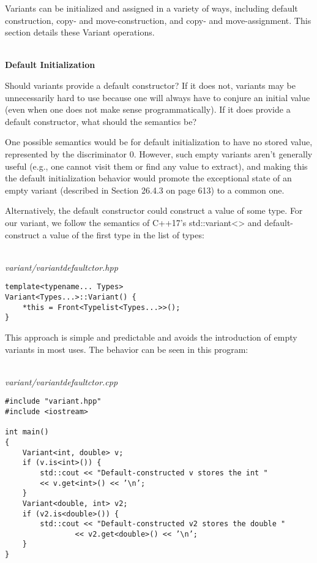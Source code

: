 Variants can be initialized and assigned in a variety of ways, including default construction, copy- and move-construction, and copy- and move-assignment. This section details these Variant operations.

\hspace*{\fill} \\ %
\noindent
\textbf{Default Initialization}

Should variants provide a default constructor? If it does not, variants may be unnecessarily hard to use because one will always have to conjure an initial value (even when one does not make sense programmatically). If it does provide a default constructor, what should the semantics be?

One possible semantics would be for default initialization to have no stored value, represented by the discriminator 0. However, such empty variants aren’t generally useful (e.g., one cannot visit them or find any value to extract), and making this the default initialization behavior would promote the exceptional state of an empty variant (described in Section 26.4.3 on page 613) to a common one.

Alternatively, the default constructor could construct a value of some type. For our variant, we follow the semantics of C++17’s std::variant<> and default-construct a value of the first type in the list of types:

\hspace*{\fill} \\ %
\noindent
\textit{variant/variantdefaultctor.hpp}
\begin{lstlisting}[style=styleCXX]
template<typename... Types>
Variant<Types...>::Variant() {
	*this = Front<Typelist<Types...>>();
}
\end{lstlisting}

This approach is simple and predictable and avoids the introduction of empty variants in most uses. The behavior can be seen in this program:

\hspace*{\fill} \\ %
\noindent
\textit{variant/variantdefaultctor.cpp}
\begin{lstlisting}[style=styleCXX]
#include "variant.hpp"
#include <iostream>

int main()
{
	Variant<int, double> v;
	if (v.is<int>()) {
		std::cout << "Default-constructed v stores the int "
		<< v.get<int>() << ’\n’;
	}
	Variant<double, int> v2;
	if (v2.is<double>()) {
		std::cout << "Default-constructed v2 stores the double "
				<< v2.get<double>() << ’\n’;
	}
}
\end{lstlisting}

